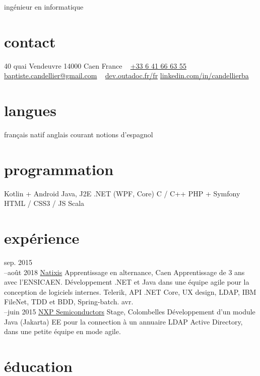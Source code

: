 \documentclass[]{friggeri-cv}
\begin{document}
{ingénieur en informatique}

\begin{aside}
    \section{contact}
    40 quai Vendeuvre
    14000 Caen
    France
    ~
    \href{tel:0033641666355}{+33 6 41 66 63 55}
    \href{mailto:baptiste.candellier@gmail.com}{baptiste.candellier@gmail.com}
    ~
    {\NoAutoSpacing\href{https://dev.outadoc.fr/fr}{dev.outadoc.fr/fr}}
    {\NoAutoSpacing\href{https://www.linkedin.com/in/candellierba/}{linkedin.com/in/candellierba}}
    \section{langues}
    français natif
    anglais courant
    notions d'espagnol
    \section{programmation}
    Kotlin + Android
    Java, J2E
    \csharp .NET (WPF, Core)
    C / C++
    PHP + Symfony
    HTML / CSS3 / JS
    Scala
\end{aside}

\section{expérience}

\begin{entrylist}
	\entry
	{sep. 2015\\--août 2018}
	{\href{https://www.natixis.com}{Natixis}}
	{Apprentissage en alternance, Caen}
	{Apprentissage de 3 ans avec l’ENSICAEN. Développement \csharp .NET et Java dans une équipe agile pour la conception de logiciels internes. Telerik, API .NET Core, UX design, LDAP, IBM FileNet, TDD et BDD, Spring-batch.}
	\entry
	{avr.\\--juin 2015}
	{\href{https://www.nxp.com}{NXP Semiconductors}}
	{Stage, Colombelles}
	{Développement d’un module Java (Jakarta) EE pour la connection à un annuaire LDAP Active Directory, dans une petite équipe en mode agile.}
\end{entrylist}

\section{éducation}
\end{document}
